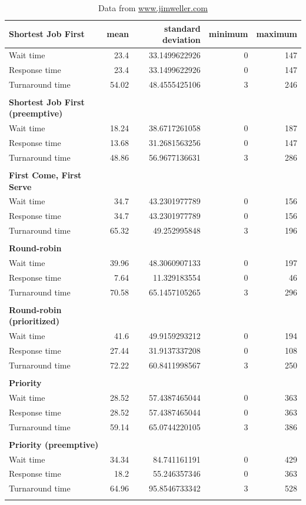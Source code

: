 \documentclass[12pt,letterpaper]{article}
\begin{document}
	  		\begin{table}
	  			\caption{Data from \url{www.jimweller.com}}
		  		\begin{tabular}{l r r r r}
					\textbf{Shortest Job First} & mean & standard deviation & minimum & maximum\\
					\hline
	Wait time &		23.4 &	33.1499622926 & 0 & 147 	 	\\
	Response time &		23.4 &	33.1499622926 &	0 &	147 	\\
	Turnaround time &	54.02 &	48.4555425106 &	3 &	246 	\\
					\\
					\textbf{Shortest Job First (preemptive)} \\
					\hline
	Wait time &		18.24 &	38.6717261058 &	0 &	187 	\\
	Response time &		13.68 &	31.2681563256 &	0 &	147 	\\
	Turnaround time &	48.86 &	56.9677136631 &	3 &	286 	\\
					\\
					\textbf{First Come, First Serve} \\
					\hline
	Wait time &		34.7 &	43.2301977789 &	0 &	156 	\\
	Response time &		34.7 &	43.2301977789 &	0 &	156 	\\
	Turnaround time &	65.32 &	49.252995848 &	3 &	196 	\\
					\\
					\textbf{Round-robin} \\
					\hline
	Wait time &		39.96 &	48.3060907133 &	0 &	197	\\
	Response time &		7.64 &	11.329183554 &	0 &	46 	\\
	Turnaround time &	70.58 &	65.1457105265 &	3 &	296 	\\
					\\
					\textbf{Round-robin (prioritized)} \\
					\hline
	Wait time &		41.6 &	49.9159293212 &	0 &	194 	\\
	Response time &		27.44 &	31.9137337208 &	0 &	108 	\\
	Turnaround time &	72.22 &	60.8411998567 &	3 &	250 	\\
					\\
					\textbf{Priority} \\
					\hline
	Wait time &		28.52 &	57.4387465044 &	0 &	363	\\
	Response time &		28.52 &	57.4387465044 &	0 &	363 	\\
	Turnaround time &	59.14 &	65.0744220105 &	3 &	386 	\\
					\\
					\textbf{Priority (preemptive)} \\
					\hline
	Wait time &		34.34 &	84.741161191 &	0 &	429 	\\
	Response time &		18.2 &	55.246357346 &	0 &	363 	\\
	Turnaround time &	64.96 &	95.8546733342 &	3 &	528 	\\

					\\
				\end{tabular}
				\label{table:data-jim}
			\end{table}
\end{document}
